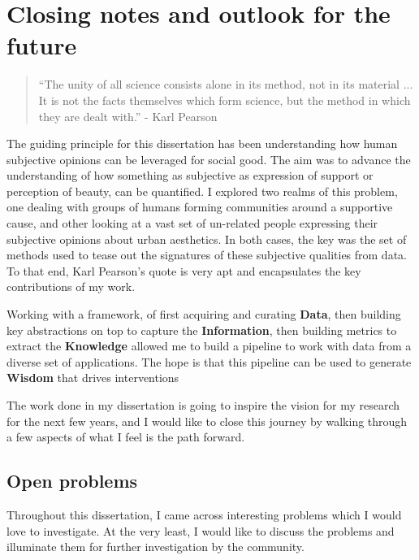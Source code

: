 \chapter{ Closing notes and outlook for the future }


\graphicspath{{Chapter6/plots/}}

\begin{quote}
    ``The unity of all science consists alone in its method, not in its material ... It is not the facts themselves which form science, but the method in which they are dealt with.'' - Karl Pearson
\end{quote}


The guiding principle for this dissertation has been understanding how human subjective opinions can be leveraged for social good. The aim was to advance the understanding of how something as subjective as expression of support or perception of beauty, can be quantified. 
I explored two realms of this problem, one dealing with groups of humans forming communities around a supportive cause, and other looking at a vast set of un-related people expressing their subjective opinions about urban aesthetics. In both cases, the key was the set of methods used to tease out the signatures of these subjective qualities from data. To that end, Karl Pearson's quote is very apt and encapsulates the key contributions of my work.

Working with a framework, of first acquiring and curating \textbf{Data}, then building key abstractions on top to capture the \textbf{Information}, then building metrics to extract the \textbf{Knowledge} allowed me to build a pipeline to work with data from a diverse set of applications. The hope is that this pipeline can be used to generate \textbf{Wisdom} that drives interventions

The work done in my dissertation is going to inspire the vision for my research for the next few years, and I would like to close this journey by walking through a few aspects of what I feel is the path forward.

\section{Open problems}
Throughout this dissertation, I came across interesting problems which I would love to investigate. At the very least, I would like to discuss the problems and illuminate them for further investigation by the community. 

